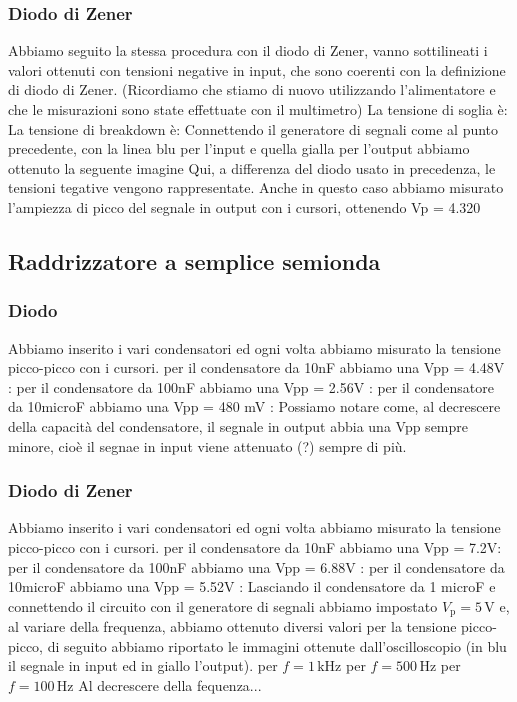 \documentclass[a4paper]{article}
\begin{document}
{{			\subsubsection{Diodo di Zener}
				Abbiamo seguito la stessa procedura con il diodo di Zener, vanno sottilineati i valori ottenuti con tensioni negative in input, che sono coerenti con la definizione di diodo di Zener.
				(Ricordiamo che stiamo di nuovo utilizzando l'alimentatore e che le misurazioni sono state effettuate con il multimetro)
				La tensione di soglia è: 
				La tensione di breakdown è:
				Connettendo il generatore di segnali come al punto precedente, con la linea blu per l'input e quella gialla per l'output abbiamo ottenuto la seguente imagine
				Qui, a differenza del diodo usato in precedenza, le tensioni tegative vengono rappresentate.		
				Anche in questo caso abbiamo misurato l'ampiezza di picco del segnale in output con i cursori, ottenendo Vp = 4.320 %
		\subsection{Raddrizzatore a semplice semionda}
			\subsubsection{Diodo}
				Abbiamo inserito i vari condensatori ed ogni volta abbiamo misurato la tensione picco-picco con i cursori.
				per il condensatore da 10nF abbiamo una Vpp = 4.48V :
				per il condensatore da 100nF abbiamo una Vpp = 2.56V :
				per il condensatore da 10microF abbiamo una Vpp = 480 mV :
				Possiamo notare come, al decrescere della capacità del condensatore, il segnale in output abbia una Vpp sempre minore, cioè il segnae in input viene attenuato (?) sempre di più.
			\subsubsection{Diodo di Zener}	
				Abbiamo inserito i vari condensatori ed ogni volta abbiamo misurato la tensione picco-picco con i cursori.
				per il condensatore da 10nF abbiamo una Vpp = 7.2V:
				per il condensatore da 100nF abbiamo una Vpp = 6.88V :
				per il condensatore da 10microF abbiamo una Vpp = 5.52V :
			Lasciando il condensatore da 1 microF e connettendo il circuito con il generatore di segnali abbiamo impostato $ V_{\mathrm{p}} = 5 \, \mathrm{V} $ e, al variare della frequenza, abbiamo ottenuto diversi valori per la tensione picco-picco, di seguito abbiamo riportato le immagini ottenute dall'oscilloscopio (in blu il segnale in input ed in giallo l'output).
			per $ f = 1 \, \mathrm{kHz} $
			per $ f = 500 \, \mathrm{Hz} $
			per $ f = 100 \, \mathrm{Hz} $
			Al decrescere della fequenza...
}}
\end{document}
